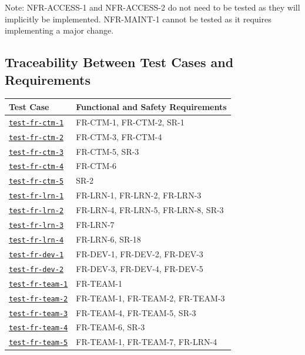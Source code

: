 \documentclass[12pt, titlepage]{article}
\newcommand{\srsref}[1]{#1}
\newcommand{\testcaseref}[1]{\hyperref[#1]{\texttt{#1}}}
\begin{document}
Note: \srsref{NFR-ACCESS-1} and \srsref{NFR-ACCESS-2} do not need to be tested as they will implicitly be implemented.
\srsref{NFR-MAINT-1} cannot be tested as it requires implementing a major change.

\subsection{Traceability Between Test Cases and Requirements}

\begin{longtable}{p{} p{}}

\toprule
Test Case & Functional and Safety Requirements \\
\midrule
\testcaseref{test-fr-ctm-1} & \srsref{FR-CTM-1}, \srsref{FR-CTM-2}, \srsref{SR-1} \\
\testcaseref{test-fr-ctm-2} & \srsref{FR-CTM-3}, \srsref{FR-CTM-4} \\
\testcaseref{test-fr-ctm-3} & \srsref{FR-CTM-5}, \srsref{SR-3} \\
\testcaseref{test-fr-ctm-4} & \srsref{FR-CTM-6} \\
\testcaseref{test-fr-ctm-5} & \srsref{SR-2} \\
\midrule
\testcaseref{test-fr-lrn-1} & \srsref{FR-LRN-1}, \srsref{FR-LRN-2}, \srsref{FR-LRN-3} \\
\testcaseref{test-fr-lrn-2} & \srsref{FR-LRN-4}, \srsref{FR-LRN-5}, \srsref{FR-LRN-8}, \srsref{SR-3} \\
\testcaseref{test-fr-lrn-3} & \srsref{FR-LRN-7} \\
\testcaseref{test-fr-lrn-4} & \srsref{FR-LRN-6}, \srsref{SR-18} \\
\midrule
\testcaseref{test-fr-dev-1} & \srsref{FR-DEV-1}, \srsref{FR-DEV-2}, \srsref{FR-DEV-3} \\
\testcaseref{test-fr-dev-2} & \srsref{FR-DEV-3}, \srsref{FR-DEV-4}, \srsref{FR-DEV-5} \\
\midrule
\testcaseref{test-fr-team-1} & \srsref{FR-TEAM-1} \\
\testcaseref{test-fr-team-2} & \srsref{FR-TEAM-1}, \srsref{FR-TEAM-2}, \srsref{FR-TEAM-3} \\
\testcaseref{test-fr-team-3} & \srsref{FR-TEAM-4}, \srsref{FR-TEAM-5}, \srsref{SR-3} \\
\testcaseref{test-fr-team-4} & \srsref{FR-TEAM-6}, \srsref{SR-3} \\
\testcaseref{test-fr-team-5} & \srsref{FR-TEAM-1}, \srsref{FR-TEAM-7}, \srsref{FR-LRN-4} \\

\end{longtable}
\end{document}
